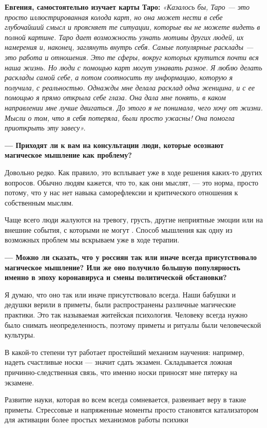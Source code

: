 \textbf{Евгения, самостоятельно изучает карты Таро: } \textit{«Казалось бы, Таро — это просто иллюстрированная колода карт, но она может нести в себе глубочайший смысл и проясняет те ситуации, которые вы не можете видеть в полной картине. Таро дает возможность узнать мотивы других людей, их намерения и, наконец, заглянуть внутрь себя. Самые популярные расклады — это работа и отношения. Это те сферы, вокруг которых крутится почти вся наша жизнь. Но люди с помощью карт могут узнавать разное. Я люблю делать расклады самой себе, а потом соотносить ту информацию, которую я получила, с реальностью. Однажды мне делала расклад одна женщина, и с ее помощью я прямо открыла себе глаза. Она дала мне понять, в каком направлении мне лучше двигаться. До этого я не понимала, чего хочу от жизни. Мысли о том, что я себя потеряла, были просто ужасны! Она помогла приоткрыть эту завесу». }

\textbf{--- Приходят ли к вам на консультации люди, которые осознают магическое мышление как проблему?}

Довольно редко. Как правило, это всплывает уже в ходе решения каких-то других вопросов. Обычно людям кажется, что то, как они мыслят, — это норма, просто потому, что у нас нет навыка саморефлексии и критического отношения к собственным мыслям.

Чаще всего люди жалуются на тревогу, грусть, другие неприятные эмоции или на внешние события, с которыми не могут . Способ мышления как одну из возможных проблем мы вскрываем уже в ходе терапии.

\textbf{--- Можно ли сказать, что у россиян так или иначе всегда присутствовало магическое мышление? Или же оно получило большую популярность именно в эпоху коронавируса и смены политической обстановки?}

Я думаю, что оно так или иначе присутствовало всегда. Наши бабушки и дедушки верили в приметы, были распространены различные магические практики. Это так называемая житейская психология. Человеку всегда нужно было снимать неопределенность, поэтому приметы и ритуалы  были  человеческой культуры.

В какой-то степени тут работает простейший механизм научения: например, надеть счастливые носки — значит сдать экзамен. Складывается ложная причинно-следственная связь, что именно носки приносят мне пятерку на экзамене.

\begin{fancyquotes}
    Развитие науки, которая во всем всегда сомневается, развеивает веру в такие приметы. Стрессовые и напряженные моменты просто становятся катализатором для активации более простых механизмов работы психики
\end{fancyquotes}

